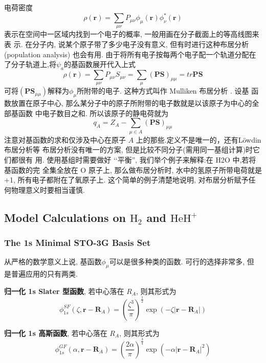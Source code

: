 \documentclass[fontset=none,12pt,a4paper]{ctexart}
\numberwithin{equation}{section}
\begin{document}
电荷密度
\begin{equation}
  \rho(\mathbf{r})=\sum_{\mu\nu}P_{\mu\nu}\phi_{\mu}(\mathbf{r})\phi_{\nu}^*(\mathbf{r})
\end{equation}
表示在空间中一区域内找到一个电子的概率, 一般用画在分子截面上的等高线图来表 示. 
在分子内, 说某个原子带了多少电子没有意义, 但有时进行这种布居分析(population analysis)
也会有用. 由于将所有电子按每两个电子配一个轨道分配在了分子轨道上,将$\psi_a$的基函数展开代入上式
\begin{equation}
  \rho(\mathbf{r})=\sum_{\mu\nu}P_{\mu\nu}S_{\mu\nu}=\sum_{\mu}(\mathbf{PS})_{\mu\mu}=tr\mathbf{PS}
\end{equation}
可将$(\mathbf{PS}_{\mu\mu})$解释为$\phi_{\mu}$所附带的电子. 这种方式叫作 Mulliken 布居分析
. 设基 函数放置在原子中心, 那么某分子中的原子所附带的电子数就是以该原子为中心的全部基函数
中电子数目之和. 所以该原子的静电荷就为
\begin{equation}
  q_A=Z_A-\sum_{\mu\in A}(\mathbf{PS})_{\mu\mu}
\end{equation}
注意对基函数的求和仅涉及中心在原子 $A$ 上的那些.定义不是唯一的，还有Löwdin 布居分析等
布居分析没有唯一的方案, 但是比较不同分子(需用同一基组计算)时它们都很有 用. 
使用基组时需要做好 ‘‘平衡”, 我们举个例子来解释:在 H2O 中,若将基函数的完 全集全放在 O 原子上, 
那么做布居分析时, 水中的氢原子所带电荷就是 +1, 所有电子都附在了氧原子上. 
这个简单的例子清楚地说明, 对布居分析赋予任何物理意义时要相当谨慎.
\subsection{Model Calculations on \texorpdfstring{$\mathrm{H}_2$}{H2} and \texorpdfstring{$\mathrm{HeH}^{+}$}{HeH+}}
\subsubsection{The 1s Minimal STO-3G Basis Set}
从严格的数学意义上说, 基函数$\phi_{\mu}$可以是很多种类的函数. 可行的选择非常多, 
但 是普遍应用的只有两类. 

\textbf{归一化 1s Slater 型函数}, 若中心落在 $R_A$, 则其形式为
\begin{equation}
  \phi_{1s}^{SF}(\zeta,\mathbf{r}-\mathbf{R}_A)=\left(\frac{\zeta^3}{\pi}\right)^{\frac{1}{2}}\exp(-\zeta|\mathbf{r}-\mathbf{R}_A|)
\end{equation}

\textbf{归一化 1s 高斯函数}, 若中心落在 $R_A$, 则其形式为
\begin{equation}
  \phi_{1s}^{GF}(\alpha,\mathbf{r}-\mathbf{R}_A)=\left(\frac{2\alpha}{\pi}\right)^{\frac{3}{4}}\exp(-\alpha|\mathbf{r}-\mathbf{R}_A|^2)
\end{equation}
\end{document}
